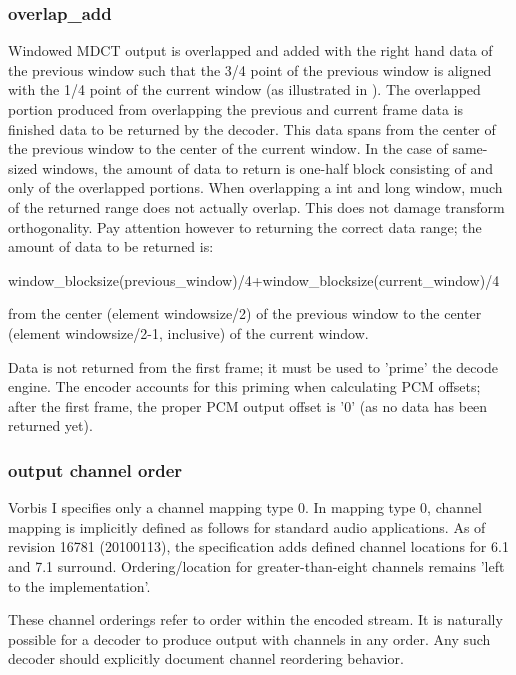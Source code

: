 \subsubsection{overlap\_add}

Windowed MDCT output is overlapped and added with the right hand data
of the previous window such that the 3/4 point of the previous window
is aligned with the 1/4 point of the current window (as illustrated in
).  The overlapped portion
produced from overlapping the previous and current frame data is
finished data to be returned by the decoder.  This data spans from the
center of the previous window to the center of the current window.  In
the case of same-sized windows, the amount of data to return is
one-half block consisting of and only of the overlapped portions. When
overlapping a int and long window, much of the returned range does not
actually overlap.  This does not damage transform orthogonality.  Pay
attention however to returning the correct data range; the amount of
data to be returned is:

\begin{programlisting}
window_blocksize(previous_window)/4+window_blocksize(current_window)/4
\end{programlisting}

from the center (element windowsize/2) of the previous window to the
center (element windowsize/2-1, inclusive) of the current window.

Data is not returned from the first frame; it must be used to 'prime'
the decode engine.  The encoder accounts for this priming when
calculating PCM offsets; after the first frame, the proper PCM output
offset is '0' (as no data has been returned yet).



\subsubsection{output channel order}

Vorbis I specifies only a channel mapping type 0.  In mapping type 0,
channel mapping is implicitly defined as follows for standard audio
applications. As of revision 16781 (20100113), the specification adds
defined channel locations for 6.1 and 7.1 surround.  Ordering/location
for greater-than-eight channels remains 'left to the implementation'.

These channel orderings refer to order within the encoded stream.  It
is naturally possible for a decoder to produce output with channels in
any order. Any such decoder should explicitly document channel
reordering behavior.

